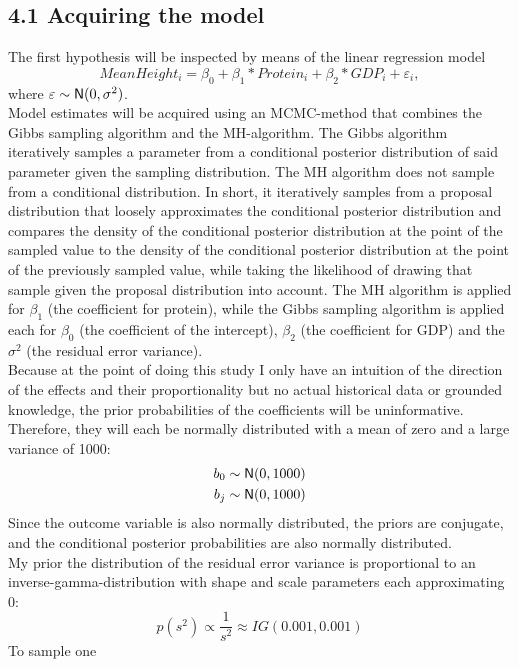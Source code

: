 \documentclass[
]{article}
\begin{document}
\hypertarget{acquiring-the-model}{%
\subsection{4.1 Acquiring the model}\label{acquiring-the-model}}

The first hypothesis will be inspected by means of the linear regression
model
\[MeanHeight_i = \beta_0 + \beta_1*Protein_i + \beta_2 * GDP_i +  \varepsilon_i,\]
where \(\varepsilon \sim {\sf N}(0, \sigma^2)\).\\
Model estimates will be acquired using an MCMC-method that combines the
Gibbs sampling algorithm and the MH-algorithm. The Gibbs algorithm
iteratively samples a parameter from a conditional posterior
distribution of said parameter given the sampling distribution. The MH
algorithm does not sample from a conditional distribution. In short, it
iteratively samples from a proposal distribution that loosely
approximates the conditional posterior distribution and compares the
density of the conditional posterior distribution at the point of the
sampled value to the density of the conditional posterior distribution
at the point of the previously sampled value, while taking the
likelihood of drawing that sample given the proposal distribution into
account. The MH algorithm is applied for \(\beta_1\) (the coefficient
for protein), while the Gibbs sampling algorithm is applied each for
\(\beta_0\) (the coefficient of the intercept), \(\beta_2\) (the
coefficient for GDP) and the \(\sigma^2\) (the residual error
variance).\\
Because at the point of doing this study I only have an intuition of the
direction of the effects and their proportionality but no actual
historical data or grounded knowledge, the prior probabilities of the
coefficients will be uninformative. Therefore, they will each be
normally distributed with a mean of zero and a large variance of 1000:
\begin{align*}
b_0 \sim {\sf N}(0,1000) \\
b_j \sim {\sf N}(0,1000)
\end{align*} Since the outcome variable is also normally distributed,
the priors are conjugate, and the conditional posterior probabilities
are also normally distributed.\\
My prior the distribution of the residual error variance is proportional
to an inverse-gamma-distribution with shape and scale parameters each
approximating 0:
\[p(s^2) \propto \frac{1}{s^2} \approx IG(0.001, 0.001)\] To sample one
\end{document}
